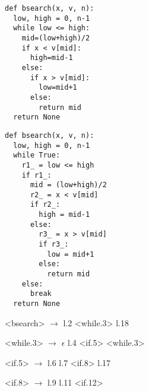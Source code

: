 \begin{figure*} %
\begin{subfigure}[h]{0.24\textwidth} %
\begin{lstlisting}[style=Python, escapechar=|,numbersep=2pt]
def bsearch(x, v, n):
  low, high = 0, n-1
  while low <= high:
    mid=(low+high)/2
    if x < v[mid]:
      high=mid-1
    else:
      if x > v[mid]:
        low=mid+1
      else:
        return mid
  return None
\end{lstlisting}
\vspace{60pt}
\end{subfigure}
\begin{subfigure}[h]{0.29\textwidth} %
\begin{lstlisting}[style=Python, escapechar=|,numbersep=2pt]
def bsearch(x, v, n):
  low, high = 0, n-1
  while True:
    r1_ = low <= high
    if r1_:
      mid = (low+high)/2
      r2_ = x < v[mid]
      if r2_:
        high = mid-1
      else:
        r3_ = x > v[mid]
        if r3_:
          low = mid+1
        else:
          return mid
    else:
      break
  return None
\end{lstlisting}
\end{subfigure}
\begin{subfigure}[h]{0.28\textwidth}   %
\begin{grammar}%
  <bsearch> $\rightarrow$ l.2 <while.3> l.18

  <while.3> $\rightarrow$ $\epsilon$
   \alt l.4 <if.5> <while.3>

  <if.5>    $\rightarrow$ l.6 l.7 <if.8>
   \alt l.17

  <if.8> $\rightarrow$ l.9
   \alt l.11 <if.12>


\end{grammar}
\end{subfigure}
\end{figure*}
